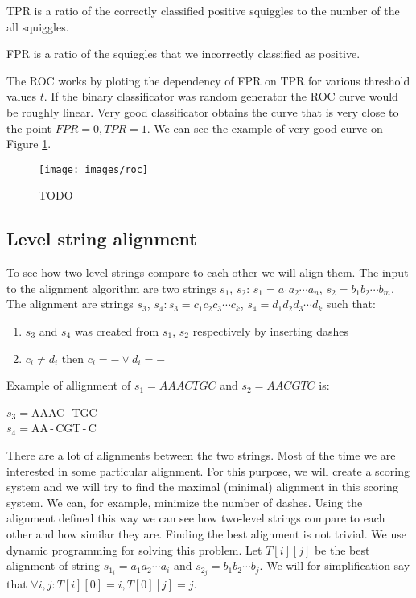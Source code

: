 TPR is a ratio of the correctly classified positive squiggles to the number of the all squiggles.

FPR is a ratio of the squiggles that we incorrectly classified as positive.

The ROC works by ploting the dependency of FPR on TPR for various threshold values $t$.
If the binary classificator was random generator the ROC curve would be roughly
linear. Very good classificator obtains the curve that is very close to the point
$FPR = 0, TPR = 1$. We can see the example of very good curve on Figure \ref{obr:roc}.

\begin{figure}
\centerline{\texttt{[image: images/roc]}}
\caption[TODO]{TODO}
\label{obr:roc}
\end{figure}

\subsection{Level string alignment}
\label{section:alignment}

To see how two level strings compare to each other we will align them. The input
to the alignment algorithm are two strings $s_1$, $s_2$:
$s_1=a_1a_2\cdots a_n$, $s_2=b_1b_2\cdots b_m$. The alignment are strings
$s_3$, $s_4: s_3 = c_1c_2c_3\cdots c_k$, $s_4 = d_1d_2d_3\cdots d_k$ such that:

\begin{enumerate}
\item $s_3$ and $s_4$ was created from $s_1$, $s_2$ respectively by inserting dashes
\item $c_i \neq d_i$ then $c_i = - \lor d_i = -$
\end{enumerate}

Example of allignment of $s_1 = AAACTGC$ and $s_2 = AACGTC$ is:

\begin{center}
$s_3 = $AAAC\,-\,TGC\\
$s_4 = $AA\,-\,CGT\,-\,C
\end{center}

There are a lot of alignments between the two strings. Most of the time we
are interested in some particular alignment. For this purpose, we will create a
scoring system and we will try to find the maximal (minimal) alignment in this scoring
system. We can, for example, minimize the number of dashes. Using the alignment
defined this way we can see how two-level strings compare to each other and how similar they are.
Finding the best alignment is not trivial. We use dynamic programming for
solving this problem. Let $T[i][j]$ be the best alignment of string $s_{1_i} = a_1a_2\cdots a_i$
and $s_{2_j} = b_1b_2\cdots b_j$. We will for simplification say that $\forall i, j: T[i][0] = i, T[0][j] = j$.

